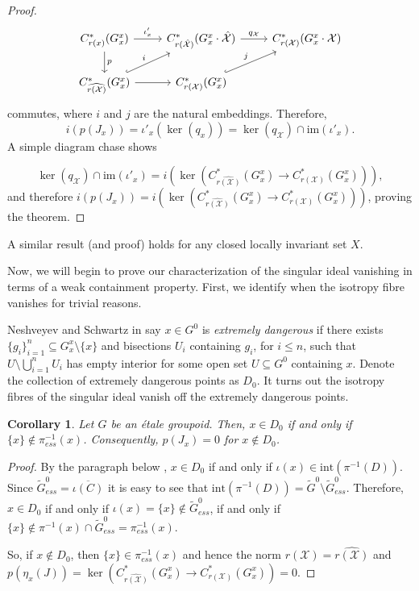 \documentclass[a4paper, 12pt]{amsart}
\newtheorem{cor}[thm]{Corollary}
\theoremstyle{definition}
\theoremstyle{remark}
\numberwithin{equation}{section}
\begin{document}
\begin{proof}
$$
\begin{tikzcd}
C^{*}_{r(x)}(G^{x}_{x}) \arrow[r, "\iota'_{x}"] \arrow[d, "p"]                        & C_{r(\hat{\mathcal{X}})}^{*}(G^{x}_{x}\cdot\hat{\mathcal{X}}) \arrow[r, "q_{\mathcal{X}}"] & C^{*}_{r(\mathcal{X})}(G^{x}_{x}\cdot\mathcal{X}) \\
C^{*}_{\widehat{r(\mathcal{X})}}(G^{x}_{x}) \arrow[ru, "i", hook] \arrow[r] & C^{*}_{r(\mathcal{X})}(G^{x}_{x}) \arrow[ru, "j", hook]                               &                                                  
\end{tikzcd}$$ commutes, where $i$ and $j$ are the natural embeddings. Therefore, $$i(p(J_{x})) = \iota'_{x}(\ker(q_{x})) = \ker(q_{\mathcal{X}})\cap \text{im}(\iota'_{x}).$$  A simple diagram chase shows

$$\ker(q_{\mathcal{X}})\cap \text{im}(\iota'_{x})  = i(\ker(C^{*}_{\widehat{r(\mathcal{X})}}(G^{x}_{x})\to C^{*}_{r(\mathcal{X})}(G^{x}_{x}))),$$ and therefore $i(p(J_{x})) = i(\ker(C^{*}_{\widehat{r(\mathcal{X})}}(G^{x}_{x})\to C^{*}_{r(\mathcal{X})}(G^{x}_{x})))$, proving the theorem.
\end{proof}

A similar result (and proof) holds for any closed locally invariant set $X$.

Now, we will begin to prove our characterization of the singular ideal vanishing in terms of a weak containment property. First, we identify when the isotropy fibre vanishes for trivial reasons.

Neshveyev and Schwartz in \cite[Proposition~1.12]{NS23} say $x\in G^{0}$ is \emph{extremely dangerous} if there exists $\{g_{i}\}^{n}_{i=1}\subseteq G^{x}_{x}\setminus \{x\}$ and bisections $U_{i}$ containing $g_{i}$, for $i\leq n$, such that $U\setminus \bigcup^{n}_{i=1}U_{i}$ has empty interior for some open set $U\subseteq G^{0}$ containing $x$. Denote the collection of extremely dangerous points as $D_{0}$. It turns out the isotropy fibres of the singular ideal vanish off the extremely dangerous points.

\begin{cor}
\label{cor:edangptchar}
    Let $G$ be an \'etale groupoid. Then, $x\in D_{0}$ if and only if $\{x\}\notin \pi^{-1}_{ess}(x)$. Consequently, $p(J_{x}) = 0$ for $x\notin D_{0}$. 
\end{cor}
\begin{proof}
    By the paragraph below \cite[Definition~4.12]{BGHL25}, $x\in D_{0}$ if and only if $\iota(x)\in \text{int}(\pi^{-1}(D))$. Since $\tilde{G}^{0}_{ess} = \overline{\iota(C)}$ it is easy to see that $\text{int}(\pi^{-1}(D)) = \tilde{G}^{0}\setminus \tilde{G}^{0}_{ess}$. Therefore, $x\in D_{0}$ if and only if $\iota(x) = \{x\}\notin \tilde{G}^{0}_{ess}$, if and only if $\{x\}\notin \pi^{-1}(x)\cap \tilde{G}^{0}_{ess} = \pi^{-1}_{ess}(x)$.

    So, if $x\notin D_{0}$, then $\{x\}\in \pi^{-1}_{ess}(x)$ and hence the norm $r(\mathcal{X}) = \widehat{r(\mathcal{X})}$ and $p(\eta_{x}(J)) = \ker(C^{*}_{\widehat{r(\mathcal{X})}}(G^{x}_{x})\to C^{*}_{r(\mathcal{X})}(G^{x}_{x})) = 0$.
\end{proof}
\end{document}
